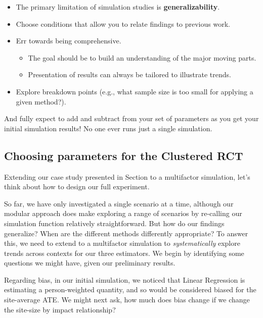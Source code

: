 \documentclass[
]{book}
\providecommand{\tightlist}{%
  \setlength{\itemsep}{0pt}\setlength{\parskip}{0pt}}
\begin{document}
\begin{itemize}
\tightlist
\item
  The primary limitation of simulation studies is \textbf{generalizability}.
\item
  Choose conditions that allow you to relate findings to previous work.
\item
  Err towards being comprehensive.

  \begin{itemize}
  \tightlist
  \item
    The goal should be to build an understanding of the major moving parts.
  \item
    Presentation of results can always be tailored to illustrate trends.
  \end{itemize}
\item
  Explore breakdown points (e.g., what sample size is too small for applying a given method?).
\end{itemize}

And fully expect to add and subtract from your set of parameters as you get your initial simulation results! No one ever runs just a single simulation.

\hypertarget{choosing-parameters-for-the-clustered-rct}{%
\subsection{Choosing parameters for the Clustered RCT}\label{choosing-parameters-for-the-clustered-rct}}

Extending our case study presented in Section \citet{case_cluster} to a multifactor simulation, let's think about how to design our full experiment.

So far, we have only investigated a single scenario at a time, although our modular approach does make exploring a range of scenarios by re-calling our simulation function relatively straightforward.
But how do our findings generalize? When are the different methods differently appropriate?
To answer this, we need to extend to a multifactor simulation to \emph{systematically} explore trends across contexts for our three estimators.
We begin by identifying some questions we might have, given our preliminary results.

Regarding bias, in our initial simulation, we noticed that Linear Regression is estimating a person-weighted quantity, and so would be considered biased for the site-average ATE.
We might next ask, how much does bias change if we change the site-size by impact relationship?
\end{document}
